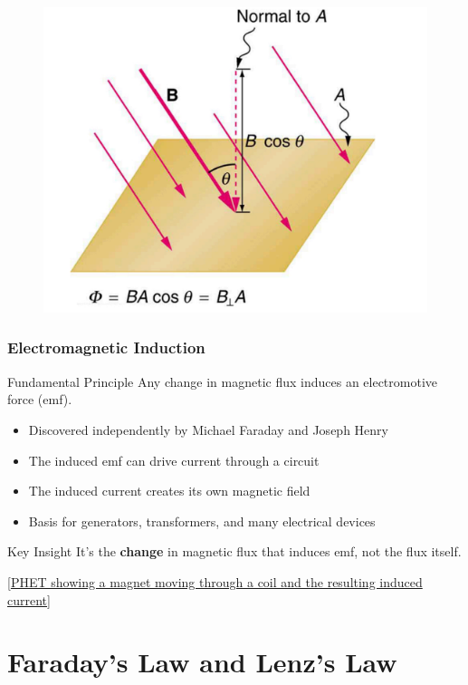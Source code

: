 \documentclass{beamer}
\begin{document}
\begin{frame}
\begin{figure}
    \centering
    \includegraphics[width=0.8\linewidth]{mangle.png}
\end{figure}

\end{frame}

\begin{frame}
\frametitle{Electromagnetic Induction}
\begin{block}{Fundamental Principle}
Any change in magnetic flux induces an electromotive force (emf).
\end{block}

\begin{itemize}
\item Discovered independently by Michael Faraday and Joseph Henry
\item The induced emf can drive current through a circuit
\item The induced current creates its own magnetic field
\item Basis for generators, transformers, and many electrical devices
\end{itemize}

\begin{alertblock}{Key Insight}
It's the \textbf{change} in magnetic flux that induces emf, not the flux itself.
\end{alertblock}

\alert{[\href{https://phet.colorado.edu/en/simulations/faraday}{PHET showing a magnet moving through a coil and the resulting induced current}]}
\end{frame}

\section{Faraday's Law and Lenz's Law}
\end{document}

